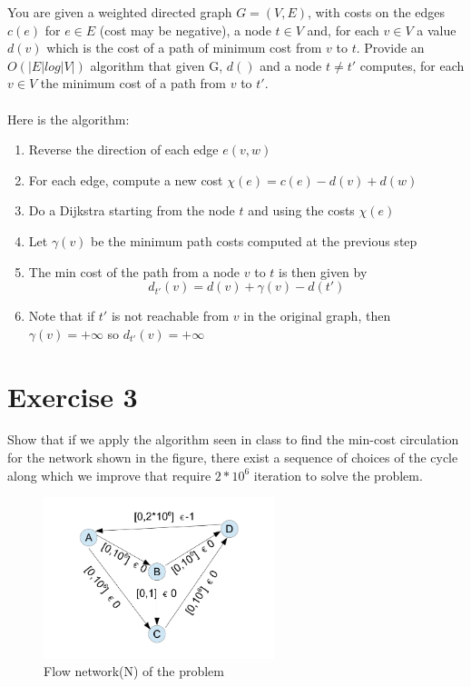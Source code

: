 \documentclass[]{article}
\begin{document}
You are given a weighted directed graph $G = (V, E)$, with costs on the edges $c(e)$ for $e ∈ E$ (cost may
be negative), a node $t ∈ V$ and, for each $v ∈ V$ a value $d(v)$ which is the cost of a path of minimum cost
from $v$ to $t$. Provide an $O(|E| log |V |)$ algorithm that given G, $d()$ and a node $t \neq t'$ computes, for each
$v ∈ V$ the minimum cost of a path from $v$ to $t'$.
\\\\
Here is the algorithm:
\begin{enumerate}
  \item Reverse the direction of each edge $e(v, w)$
  \item For each edge, compute a new cost $\chi(e) = c(e)-d(v)+d(w)$
  \item Do a Dijkstra starting from the node $t$ and using the costs $\chi(e)$
  \item Let $\gamma(v)$ be the minimum path costs computed at the previous step
  \item The min cost of the path from a node $v$ to $t$ is then given by $$d_{t'}(v) = d(v) + \gamma(v) - d(t')$$
  \item Note that if $t'$ is not reachable from $v$ in the original graph, then $\gamma(v) = +\infty$ so $d_{t'}(v) = +\infty$
\end{enumerate}

\subsection{}


\section{Exercise 3}

Show that if we apply the algorithm seen in class to find the min-cost circulation for the network shown
in the figure, there exist a sequence of choices of the cycle along which we improve that require $2*10^6$
iteration to solve the problem.



\begin{figure}[H]
	\begin{center}
		\includegraphics[width=0.6\textwidth]{abcd.png}
		\caption{Flow network(N) of the problem }

	\end{center}
\end{figure}
\end{document}

